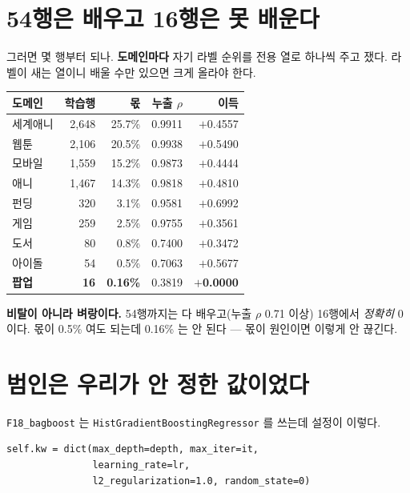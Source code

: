 \documentclass[10pt]{article}
\begin{document}
\section{54행은 배우고 16행은 못 배운다}

그러면 몇 행부터 되나. \textbf{도메인마다} 자기 라벨 순위를 전용 열로 하나씩
주고 쟀다. 라벨이 새는 열이니 배울 수만 있으면 크게 올라야 한다.

\begin{center}\small
\begin{tabular}{lrrrr}
\hline
도메인 & 학습행 & 몫 & 누출 $\rho$ & 이득 \\
\hline
세계애니 & 2,648 & 25.7\% & 0.9911 & $+$0.4557 \\
웹툰 & 2,106 & 20.5\% & 0.9938 & $+$0.5490 \\
모바일 & 1,559 & 15.2\% & 0.9873 & $+$0.4444 \\
애니 & 1,467 & 14.3\% & 0.9818 & $+$0.4810 \\
펀딩 & 320 & 3.1\% & 0.9581 & $+$0.6992 \\
게임 & 259 & 2.5\% & 0.9755 & $+$0.3561 \\
도서 & 80 & 0.8\% & 0.7400 & $+$0.3472 \\
아이돌 & 54 & 0.5\% & 0.7063 & $+$0.5677 \\
\textbf{팝업} & \textbf{16} & \textbf{0.16\%} & 0.3819 & \textbf{$+$0.0000} \\
\hline
\end{tabular}
\end{center}

\textbf{비탈이 아니라 벼랑이다.} 54행까지는 다 배우고(누출 $\rho$ 0.71 이상)
16행에서 \emph{정확히} 0 이다. 몫이 0.5\% 여도 되는데 0.16\% 는 안 된다 ---
몫이 원인이면 이렇게 안 끊긴다.

\section{범인은 우리가 안 정한 값이었다}

\texttt{F18\_bagboost} 는 \texttt{HistGradientBoostingRegressor} 를 쓰는데
설정이 이렇다.

\begin{center}\small
\begin{verbatim}
self.kw = dict(max_depth=depth, max_iter=it,
               learning_rate=lr,
               l2_regularization=1.0, random_state=0)
\end{verbatim}
\end{center}
\end{document}

